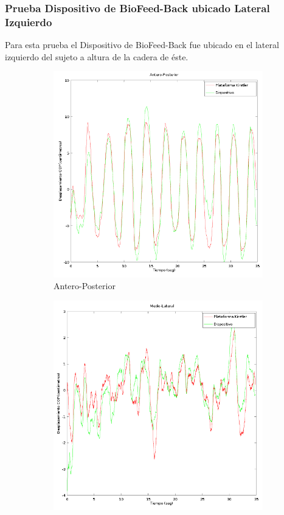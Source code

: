 \documentclass[12pt,a4paper]{article}
\newcommand{\nombreDispositivo}{Dispositivo de BioFeed-Back }
\begin{document}
\newpage
\subsubsection{Prueba \nombreDispositivo ubicado Lateral Izquierdo}
	Para esta prueba el \nombreDispositivo fue ubicado en el lateral izquierdo del sujeto a altura de la cadera de éste.
		
	\begin{figure}[H]
		\centering
		\begin{subfigure}{.5\textwidth}
			\centering
			\includegraphics[width=1\linewidth]{images/pruebas/LateralIzquierdo/Antero-Posterior}
			\caption{Antero-Posterior}
			\label{fig:anteroPosteriorLateral}
		\end{subfigure}%
		\begin{subfigure}{.5\textwidth}
			\centering
			\includegraphics[width=1\linewidth]{images/pruebas/LateralIzquierdo/Medio-Lateral}

\end{subfigure}
\end{figure}
\end{document}
